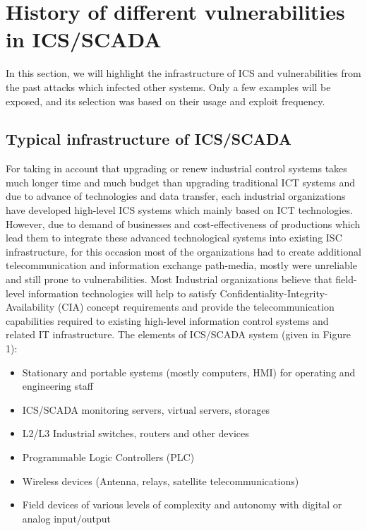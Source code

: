 \documentclass[conference]{IEEEtran}
\begin{document}
\section{History of different vulnerabilities in ICS/SCADA}
\label{sec:CT}
In this section, we will highlight the infrastructure of ICS and vulnerabilities from the past attacks which infected other systems.
Only a few examples will be exposed, and its selection was based on their usage and exploit frequency.
\subsection{Typical infrastructure of ICS/SCADA}
For taking in account that upgrading or renew industrial control systems takes much longer time and much budget than upgrading traditional ICT systems and due to advance of technologies and data transfer, each industrial organizations have developed high-level ICS systems which mainly based on ICT technologies. However, due to demand of businesses and cost-effectiveness of productions which lead them to integrate these advanced technological systems into existing ISC infrastructure, for this occasion most of the organizations had to create additional telecommunication and information exchange path-media, mostly were unreliable and still prone to vulnerabilities. Most Industrial organizations believe that field-level information technologies will help to satisfy Confidentiality-Integrity-Availability (CIA) concept requirements and provide the telecommunication capabilities required to existing high-level information control systems and related IT infrastructure. The elements of ICS/SCADA system (given in Figure 1):
\begin{itemize}
   \item Stationary and portable systems (mostly computers, HMI) for operating and engineering staff
   \item ICS/SCADA monitoring servers, virtual servers, storages
   \item L2/L3 Industrial switches, routers and other devices
   \item Programmable Logic Controllers (PLC)
   \item Wireless devices (Antenna, relays, satellite telecommunications)
   \item Field devices of various levels of complexity and autonomy with digital or analog input/output
\end{itemize}
\end{document}
